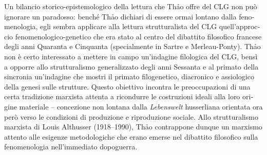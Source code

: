 \documentclass[output=paper]{../langscibook}
\begin{document}
\begin{otherlanguage}{italian}
Un bilancio storico-epistemologico della lettura che Th\textlatin{ả}o offre del CLG non può ignorare un paradosso: benché Th\textlatin{ả}o dichiari di essere ormai lontano dalla fenomenologia, egli sembra applicare alla lettura strutturalista del CLG quell’approccio fenomenologico-genetico che era stato al centro del dibattito filosofico francese degli anni Quaranta e Cinquanta (specialmente in Sartre e Merleau-Ponty). Th\textlatin{ả}o non è certo interessato a mettere in campo un’indagine filologica del CLG, bensì a opporre allo strutturalismo generalizzato degli anni Sessanta e al primato della sincronia un’indagine che mostri il primato filogenetico, diacronico e assiologico della genesi sulle strutture. Questo obiettivo incontra le preoccupazioni di una certa tradizione marxista attenta a ricondurre le costruzioni ideali alla loro origine materiale – concezione non lontana dalla \textit{Lebenswelt} husserliana orientata ora però verso le condizioni di produzione e riproduzione sociale. Allo strutturalismo marxista di Louis Althusser (1918--1990), Th\textlatin{ả}o contrappone dunque un marxismo attento alle esigenze metodologiche che erano emerse nel dibattito filosofico sulla fenomenologia nell’immediato dopoguerra.


{\sloppy\printbibliography[heading=subbibliography,notkeyword=this]}
\end{otherlanguage}
\end{document}

